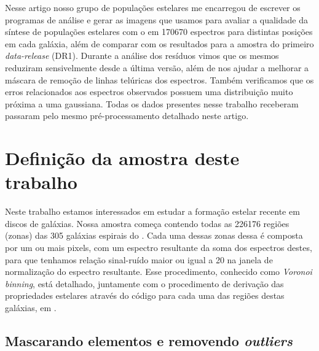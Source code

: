 Nesse artigo nosso grupo de populações estelares me encarregou de escrever os programas de análise e
gerar as imagens que usamos para avaliar a qualidade da síntese de populações estelares com o
\starlight em 170670 espectros para distintas posições em cada galáxia, além de comparar com os
resultados para a amostra do primeiro {\em data-release} (DR1). Durante a análise dos resíduos vimos
que os mesmos reduziram sensivelmente desde a última versão, além de nos ajudar a melhorar a máscara
de remoção de linhas telúricas dos espectros. Também verificamos que os erros relacionados aos
espectros observados possuem uma distribuição muito próxima a uma gaussiana. Todas os dados
presentes nesse trabalho receberam passaram pelo mesmo pré-processamento detalhado neste artigo.

\section{Definição da amostra deste trabalho}
\label{sec:amostra:definicao}

Neste trabalho estamos interessados em estudar a formação estelar recente em discos de galáxias.
Nossa amostra começa contendo todas as 226176 regiões (zonas) das 305 galáxias espirais do \CAL.
Cada uma dessas zonas dessa é composta por um ou mais pixels, com um espectro resultante da soma dos
espectros destes, para que tenhamos relação sinal-ruído maior ou igual a 20 na janela de
normalização do espectro resultante. Esse procedimento, conhecido como {\em Voronoi binning}, está
detalhado, juntamente com o procedimento de derivação das propriedades estelares através do código
\starlight para cada uma das regiões destas galáxias, em \citet{CidFernandes.etal.2013a}.

\subsection{Mascarando elementos e removendo {\em outliers}}
\label{sec:amostra:mask}

